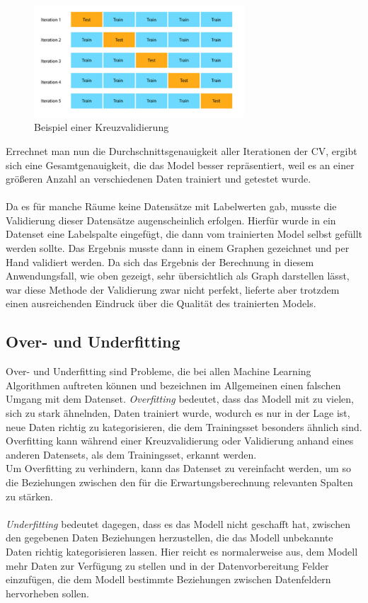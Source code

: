 \begin{figure}[h]
    \centering
    \includegraphics[width=0.7\textwidth]{pic/CV.png}
    \caption{Beispiel einer Kreuzvalidierung}
    \label{fig:CV}
\end{figure}

Errechnet man nun die Durchschnittsgenauigkeit aller Iterationen der CV, ergibt sich eine Gesamtgenauigkeit, 
die das Model besser repräsentiert, weil es an einer größeren Anzahl an verschiedenen Daten trainiert und 
getestet wurde.
\\\\
Da es für manche Räume keine Datensätze mit Labelwerten gab, musste die Validierung dieser Datensätze 
augenscheinlich erfolgen. Hierfür wurde in ein Datenset eine Labelspalte eingefügt, die dann vom trainierten
Model selbst gefüllt werden sollte. Das Ergebnis musste dann in einem Graphen gezeichnet und per Hand validiert 
werden. Da sich das Ergebnis der Berechnung in diesem Anwendungsfall, wie oben gezeigt, sehr übersichtlich als 
Graph darstellen lässt, war diese Methode der Validierung zwar nicht perfekt, lieferte aber trotzdem einen 
ausreichenden Eindruck über die Qualität des trainierten Models.


\subsection{Over- und Underfitting}
Over- und Underfitting sind Probleme, die bei allen Machine Learning Algorithmen auftreten können und bezeichnen 
im Allgemeinen einen falschen Umgang mit dem Datenset.
\textit{Overfitting} bedeutet, dass das Modell mit zu vielen, sich zu stark ähnelnden, Daten trainiert wurde, 
wodurch es nur in der Lage ist, neue Daten richtig zu kategorisieren, die dem Trainingsset besonders ähnlich sind.
Overfitting kann während einer Kreuzvalidierung oder Validierung anhand eines anderen Datensets, als dem 
Trainingsset, erkannt werden.\\
Um Overfitting zu verhindern, kann das Datenset zu vereinfacht werden, um so die Beziehungen zwischen den
für die Erwartungsberechnung relevanten Spalten zu stärken.\\\\
\textit{Underfitting} bedeutet dagegen, dass es das Modell nicht geschafft hat, zwischen den gegebenen Daten
Beziehungen herzustellen, die das Modell unbekannte Daten richtig kategorisieren lassen. Hier reicht es 
normalerweise aus, dem Modell mehr Daten zur Verfügung zu stellen und in der Datenvorbereitung Felder 
einzufügen, die dem Modell bestimmte Beziehungen zwischen Datenfeldern hervorheben sollen. 


